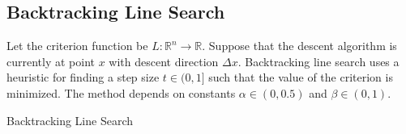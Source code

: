 \documentclass[12pt,letterpaper]{article}
\begin{document}
\subsection{Backtracking Line Search}

Let the criterion function be $L:\mathbb{R}^n \rightarrow \mathbb{R}$. Suppose that the descent algorithm is currently at point $x$ with descent direction $\Delta x$. Backtracking line search uses a heuristic for finding a step size $t \in (0,1]$ such that the value of the criterion is minimized. The method depends on constants $\alpha  \in (0, 0.5)$ and $\beta \in (0,1)$.

\begin{algorithm}
\caption{Backtracking Line Search}
\label{alg:backtracking}
         \begin{algorithmic}
  	 \\
	\ENDWHILE
	\end{algorithmic}
\end{algorithm}
\end{document}
